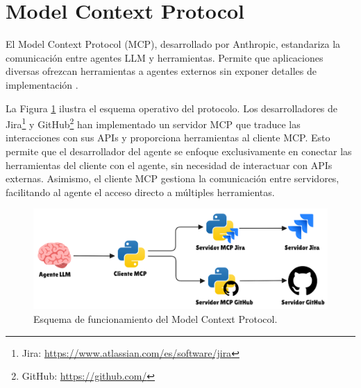 \section{Model Context Protocol}
\label{sec:mcp_prots}
El Model Context Protocol (MCP), desarrollado por Anthropic, estandariza la comunicación entre agentes LLM y herramientas. Permite que aplicaciones diversas ofrezcan herramientas a agentes externos sin exponer detalles de implementación \cite{noauthor_model_nodate}.

La Figura \ref{fig:mcp} ilustra el esquema operativo del protocolo. Los desarrolladores de Jira\footnote{Jira: \url{https://www.atlassian.com/es/software/jira}} y GitHub\footnote{GitHub: \url{https://github.com/}} han implementado un servidor MCP que traduce las interacciones con sus APIs y proporciona herramientas al cliente MCP. Esto permite que el desarrollador del agente se enfoque exclusivamente en conectar las herramientas del cliente con el agente, sin necesidad de interactuar con APIs externas. Asimismo, el cliente MCP gestiona la comunicación entre servidores, facilitando al agente el acceso directo a múltiples herramientas.

\begin{figure}[h]
  \centering
  \includegraphics[width=1\linewidth]{figures/mcp.png}
  \caption{Esquema de funcionamiento del Model Context Protocol.}
  \label{fig:mcp}
\end{figure}


